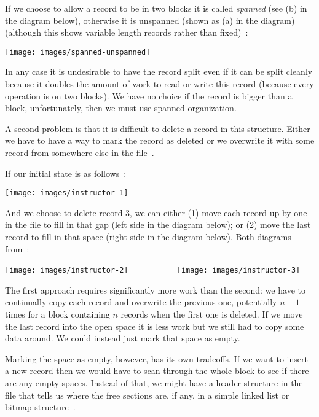\documentclass[a4paper]{report}
\begin{document}
If we choose to allow a record to be in two blocks it is called \textit{spanned} (see (b) in the diagram below), otherwise it is unspanned (shown as (a) in the diagram) (although this shows variable length records rather than fixed)~\cite{fds}:

\begin{center}
\texttt{[image: images/spanned-unspanned]}
\end{center}

In any case it is undesirable to have the record split even if it can be split cleanly because it doubles the amount of work to read or write this record (because every operation is on two blocks). We have no choice if the record is bigger than a block, unfortunately, then we must use spanned organization. 

A second problem is that it is difficult to delete a record in this structure. Either we have to have a way to mark the record as deleted or we overwrite it with some record from somewhere else in the file~\cite{dsc}.

If our initial state is as follows~\cite{dsc}:

\begin{center}
\texttt{[image: images/instructor-1]}
\end{center}

And we choose to delete record 3, we can either (1) move each record up by one in the file to fill in that gap (left side in the diagram below); or (2) move the last record to fill in that space (right side in the diagram below). Both diagrams from~\cite{dsc}:

\begin{center}
\texttt{[image: images/instructor-2]} 
~~~~~~~~~~
\texttt{[image: images/instructor-3]}
\end{center}

The first approach requires significantly more work than the second: we have to continually copy each record and overwrite the previous one, potentially $n-1$ times for a block containing $n$ records when the first one is deleted. If we move the last record into the open space it is less work but we still had to copy some data around. We could instead just mark that space as empty. 

Marking the space as empty, however, has its own tradeoffs. If we want to insert a new record then we would have to scan through the whole block to see if there are any empty spaces. Instead of that, we might have a header structure in the file that tells us where the free sections are, if any, in a simple linked list or bitmap structure~\cite{dsc}. 
\end{document}
